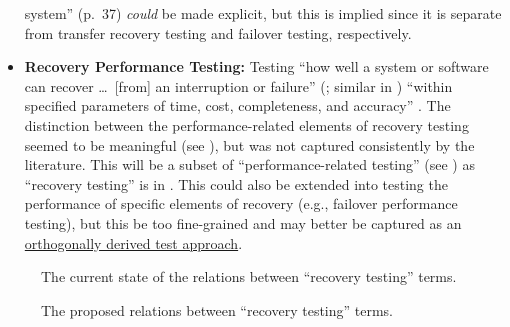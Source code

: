 \begin{itemize}
            system'' (p.~37) \emph{could} be made explicit, but this is implied
            since it is separate from transfer recovery testing and failover
            testing, respectively.
      \item \textbf{Recovery Performance Testing:} Testing ``how well a system or
            software can recover \dots\ [from] an interruption or failure''
            (\citealp[p.~7-10]{SWEBOK2024}; similar in \citealp{ISO_IEC2023a})
            ``within specified parameters of time, cost, completeness, and
            accuracy'' \citep[p.~2]{IEEE2013}. The distinction between the
            performance-related elements of recovery testing seemed to be
            meaningful (see ), but was not captured
            consistently by the literature. This will be a subset of
            ``performance-related testing'' (see )
            as ``recovery testing'' is in \citep[p.~22]{IEEE2022}. This could
            also be extended into testing the performance of specific elements
            of recovery (e.g., failover performance testing), but this be too
            fine-grained and may better be captured as an
            \hyperref[chap:testing:sec:orthogonal-tests]
            {orthogonally derived test approach}.
\end{itemize}

\begin{figure}[hbtp!]
      \centering
      \begin{minipage}{.5\textwidth}
            \centering
            \recoveryGraphCurrent{}
            \caption{The current state of the relations between ``recovery
                  testing'' terms.}
            \label{fig:recovery-graph-current}
      \end{minipage}%
      \begin{minipage}{.5\textwidth}
            \centering
            \recoveryGraphProposed{}
            \caption{The proposed relations between ``recovery testing'' terms.}
            \label{fig:recovery-graph-proposed}
      \end{minipage}
\end{figure}